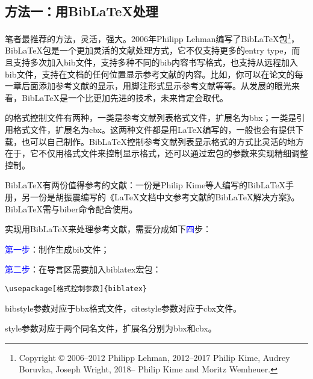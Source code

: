 \documentclass[cn,hazy,blue,14pt,geye,normal,]{elegantnote}
\begin{document}
\subsection{方法一：用Bib\LaTeX{}处理}
笔者最推荐的方法，灵活，强大。\(2006\)年Philipp Lehman编写了Bib\LaTeX{}包\footnote{Copyright © 2006–2012 Philipp Lehman, 2012–2017 Philip Kime, Audrey Boruvka, Joseph Wright, 2018– Philip Kime and Moritz Wemheuer.}，Bib\LaTeX{}包是一个更加灵活的文献处理方式，它不仅支持更多的entry type，而且支持多次加入bib文件，支持多种不同的bib内容书写格式，也支持从远程加入bib文件，支持在文档的任何位置显示参考文献的内容。比如，你可以在论文的每一章后面添加参考文献的显示，用脚注形式显示参考文献等等。从发展的眼光来看，Bib\LaTeX{}是一个比\BibTeX{}更加先进的技术，未来肯定会取代\BibTeX{}。\par
\BibTeX{}的格式控制文件有两种，一类是参考文献列表格式文件，扩展名为bbx；一类是引用格式文件，扩展名为cbx。这两种文件都是用\LaTeX{}编写的，一般也会有提供下载，也可以自己制作。Bib\LaTeX{}控制参考文献列表显示格式的方式比\BibTeX{}灵活的地方在于，它不仅用格式文件来控制显示格式，还可以通过宏包的参数来实现精细调整控制。\par
Bib\LaTeX{}有两份值得参考的文献：一份是Philip Kime等人编写的Bib\LaTeX{}手册\cite{biblatexmanual20191201}，另一份是胡振震编写的《{\LaTeX}文档中文参考文献的{Bib\LaTeX}解决方案》\cite{huzhengzheng20200602}。Bib\LaTeX{}需与biber命令配合使用。\par
实现用Bib\LaTeX{}来处理参考文献，需要分成如下\textcolor{blue}{四}步：\par
\textcolor{blue}{第一步}：制作生成bib文件；\par
\textcolor{blue}{第二步}：在导言区需要加入biblatex宏包：\par
\begin{lstlisting}
\usepackage[格式控制参数]{biblatex}
\end{lstlisting}\par
bibstyle参数对应于bbx格式文件，citestyle参数对应于cbx文件。\par
style参数对应于两个同名文件，扩展名分别为bbx和cbx。
\end{document}
